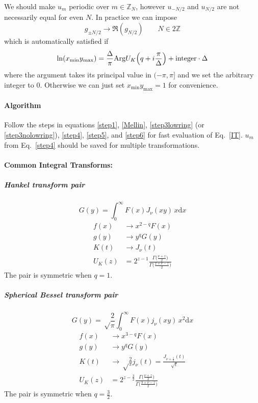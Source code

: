 \documentclass{article}
\renewcommand{\d}{\mathrm{d}}
\newcommand{\xmin}{x_\textrm{min}}
\newcommand{\ymax}{y_\textrm{max}}
\begin{document}
We should make $u_m$ periodic over $m\in\mathbb{Z}_N$, however
$u_{-N/2}$ and $u_{N/2}$ are not necessarily equal for even $N$.
In practice we can impose
\begin{equation}
    \label{step3nolowring}
    g_{\pm N/2} \to \Re(g_{N/2}) \qquad N\in2\mathbb{Z}
\end{equation}
which is automatically satisfied if
\begin{equation}
    \label{step3lowring}
    \ln(\xmin\ymax) = \frac\Delta\pi \mathrm{Arg} U_K\Bigl(q+i\frac\pi\Delta\Bigr)
    + \textrm{integer} \cdot \Delta
\end{equation}
where the argument takes its principal value in $(-\pi,\pi]$
and we set the arbitrary integer to 0.
Otherwise we can just set $\xmin\ymax=1$ for convenience.


\paragraph{Algorithm}
Follow the steps in equations \eqref{step1}, \eqref{Mellin},
\eqref{step3lowring} (or \eqref{step3nolowring}), \eqref{step4}, \eqref{step5},
and \eqref{step6} for fast evaluation of Eq.~\eqref{IT}.
$u_m$ from Eq.~\eqref{step4} should be saved for multiple transformations.


\paragraph{Common Integral Transforms:}


\subparagraph{Hankel transform pair}
\begin{equation}
    G(y) = \int_0^\infty F(x) J_\nu(xy) \,x\d x
\end{equation}
\begin{align}
    f(x) &\to x^{2-q}F(x)  \\
    g(y) &\to y^q G(y)  \\
    K(t) &\to J_\nu(t)  \\
    U_K(z) &= 2^{z-1} \frac{\Gamma\bigl(\frac{\nu+z}2\bigr)}{\Gamma\bigl(\frac{2+\nu-z}2\bigr)}
\end{align}
The pair is symmetric when $q=1$.


\subparagraph{Spherical Bessel transform pair}
\begin{equation}
    G(y) = \sqrt\frac2\pi \int_0^\infty F(x) j_\nu(xy) \,x^2\d x
\end{equation}
\begin{align}
    f(x) &\to x^{3-q} F(x)  \\
    g(y) &\to y^q G(y)  \\
    K(t) &\to \sqrt\frac2\pi j_\nu(t) = \frac{J_{\nu+\frac12}(t)}{\sqrt t}  \\
    U_K(z) &= 2^{z-\frac32} \frac{\Gamma\bigl(\frac{\nu+z}2\bigr)}{\Gamma\bigl(\frac{3+\nu-z}2\bigr)}
\end{align}
The pair is symmetric when $q=\frac32$.
\end{document}
